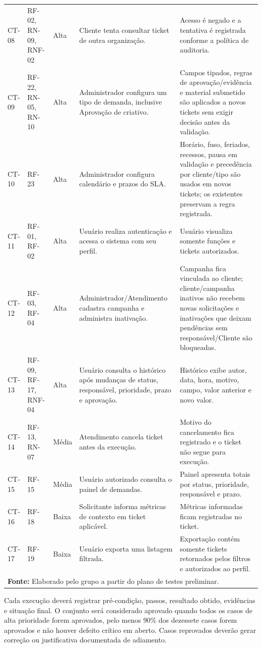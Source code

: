 \begin{longtable}{p{}p{}p{}p{}p{}}
CT-08 & RF-02, RN-09, RNF-02 & Alta & Cliente tenta consultar ticket de outra organização. & Acesso é negado e a tentativa é registrada conforme a política de auditoria. \\
CT-09 & RF-22, RN-05, RN-10 & Alta & Administrador configura um tipo de demanda, inclusive Aprovação de criativo. & Campos tipados, regras de aprovação/evidência e material submetido são aplicados a novos tickets sem exigir decisão antes da validação. \\
CT-10 & RF-23 & Alta & Administrador configura calendário e prazos do SLA. & Horário, fuso, feriados, recessos, pausa em validação e precedência por cliente/tipo são usados em novos tickets; os existentes preservam a regra registrada. \\
CT-11 & RF-01, RF-02 & Alta & Usuário realiza autenticação e acessa o sistema com seu perfil. & Usuário visualiza somente funções e tickets autorizados. \\
CT-12 & RF-03, RF-04 & Alta & Administrador/Atendimento cadastra campanha e administra inativação. & Campanha fica vinculada ao cliente; cliente/campanha inativos não recebem novas solicitações e inativações que deixam pendências sem responsável/Cliente são bloqueadas. \\
CT-13 & RF-09, RF-17, RNF-04 & Alta & Usuário consulta o histórico após mudanças de status, responsável, prioridade, prazo e aprovação. & Histórico exibe autor, data, hora, motivo, campo, valor anterior e novo valor. \\
CT-14 & RF-13, RN-07 & Média & Atendimento cancela ticket antes da execução. & Motivo do cancelamento fica registrado e o ticket não segue para execução. \\
CT-15 & RF-15 & Média & Usuário autorizado consulta o painel de demandas. & Painel apresenta totais por status, prioridade, responsável e prazo. \\
CT-16 & RF-18 & Baixa & Solicitante informa métricas de contexto em ticket aplicável. & Métricas informadas ficam registradas no ticket. \\
CT-17 & RF-19 & Baixa & Usuário exporta uma listagem filtrada. & Exportação contém somente tickets retornados pelos filtros e autorizados ao perfil. \\
\hline
\multicolumn{5}{l}{\footnotesize\textbf{Fonte:} Elaborado pelo grupo a partir do plano de testes preliminar.}
\end{longtable}

Cada execução deverá registrar pré-condição, passos, resultado obtido, evidências e situação final. O conjunto será considerado aprovado quando todos os casos de alta prioridade forem aprovados, pelo menos 90\% dos dezessete casos forem aprovados e não houver defeito crítico em aberto. Casos reprovados deverão gerar correção ou justificativa documentada de adiamento.
